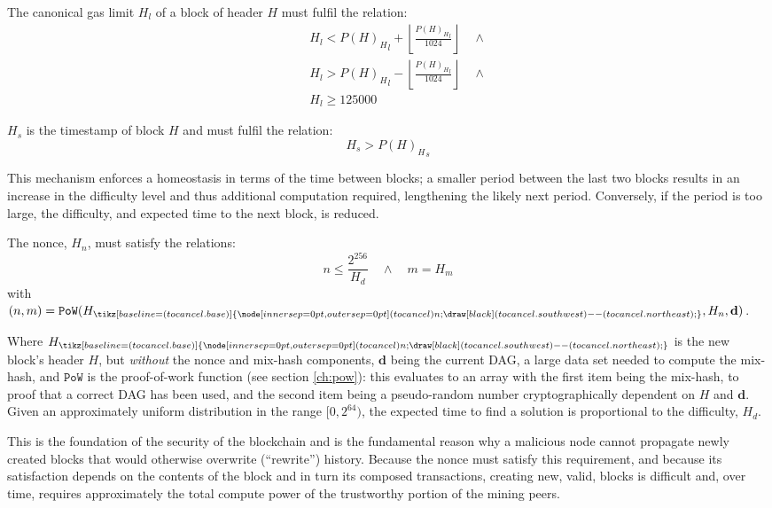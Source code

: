 \documentclass[9pt,oneside]{amsart}
\newcommand{\hcancel}[1]{%
    \tikz[baseline=(tocancel.base)]{
        \node[inner sep=0pt,outer sep=0pt] (tocancel) {#1};
        \draw[black] (tocancel.south west) -- (tocancel.north east);
    }%
}%
\begin{document}
\begin{multicols}{2}
The canonical gas limit $H_l$ of a block of header $H$ must fulfil the relation:
\begin{eqnarray}
& & H_l < {P(H)_H}_l + \left\lfloor\frac{{P(H)_H}_l}{1024}\right\rfloor \quad \wedge \\
& & H_l > {P(H)_H}_l - \left\lfloor\frac{{P(H)_H}_l}{1024}\right\rfloor \quad \wedge \\
& & H_l \geqslant 125000
\end{eqnarray}

$H_s$ is the timestamp of block $H$ and must fulfil the relation:
\begin{equation}
H_s > {P(H)_H}_s
\end{equation}

This mechanism enforces a homeostasis in terms of the time between blocks; a smaller period between the last two blocks results in an increase in the difficulty level and thus additional computation required, lengthening the likely next period. Conversely, if the period is too large, the difficulty, and expected time to the next block, is reduced.

The nonce, $H_n$, must satisfy the relations:
\begin{equation}
n \leqslant \frac{2^{256}}{H_d} \quad \wedge \quad m = H_m
\end{equation}
with $(n, m) = \mathtt{PoW}(H_{\hcancel{n}}, H_n, \mathbf{d})$.

Where $H_{\hcancel{n}}$ is the new block's header $H$, but \textit{without} the nonce and mix-hash components, $\mathbf{d}$ being the current DAG, a large data set needed to compute the mix-hash, and $\mathtt{PoW}$ is the proof-of-work function (see section \ref{ch:pow}): this evaluates to an array with the first item being the mix-hash, to proof that a correct DAG has been used, and the second item being a pseudo-random number cryptographically dependent on $H$ and $\mathbf{d}$. Given an approximately uniform distribution in the range $[0, 2^{64})$, the expected time to find a solution is proportional to the difficulty, $H_d$.

This is the foundation of the security of the blockchain and is the fundamental reason why a malicious node cannot propagate newly created blocks that would otherwise overwrite (``rewrite'') history. Because the nonce must satisfy this requirement, and because its satisfaction depends on the contents of the block and in turn its composed transactions, creating new, valid, blocks is difficult and, over time, requires approximately the total compute power of the trustworthy portion of the mining peers.


\end{multicols}
\end{document}

